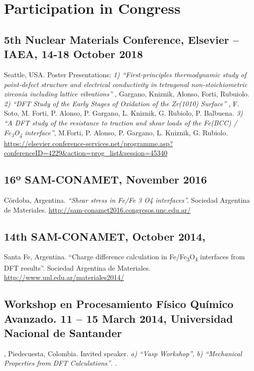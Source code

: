 \section{Participation in Congress}

\subsection{ 5th Nuclear Materials Conference, Elsevier – IAEA, 14-18 October 2018} Seattle, USA. Poster Presentations:
\emph{ 1) “First-principles thermodynamic study of point-defect structure and electrical conductivity in tetragonal non-stoichiometric zirconia including lattice vibrations”} , Gargano, Kniznik, Alonso, Forti, Rubuiolo. \emph{ 2) “DFT Study of the Early Stages of Oxidation of the Zr(1010) Surface”} , F. Soto, M. Forti, P. Alonso, P. Gargano, L. Kniznik, G. Rubiolo, P. Balbuena. \emph{ 3) “A DFT study of the resistance to traction and shear loads of the Fe(BCC) / Fe\textsubscript{3}O\textsubscript{4} interface”}, M.Forti, P. Alonso, P. Gargano, L. Kniznik, G. Rubiolo. 
\url{https://elsevier.conference-services.net/programme.asp?conferenceID=4229&action=prog_list&session=45340}

\subsection{16º SAM-CONAMET, November 2016} Córdoba, Argentina. \emph{“Shear stress in Fe/Fe 3 O4 interfaces”. }Sociedad Argentina de Materiales. \url{http://sam-conamet2016.congresos.unc.edu.ar/}

\subsection{14th SAM-CONAMET, October 2014,} Santa Fe, Argentina. “Charge difference calculation in Fe/Fe\textsubscript{3}O\textsubscript{4} interfaces from DFT results”. Sociedad Argentina de Materiales. \url{http://www.unl.edu.ar/materiales2014/}

\subsection{ Workshop en Procesamiento Físico Químico Avanzado. 11 – 15 March 2014, Universidad Nacional de Santander}, Piedecuesta, Colombia. Invited speaker. \emph{ a) “Vasp Workshop”},\emph{ b) “Mechanical Properties from DFT Calculations”}. 
.

